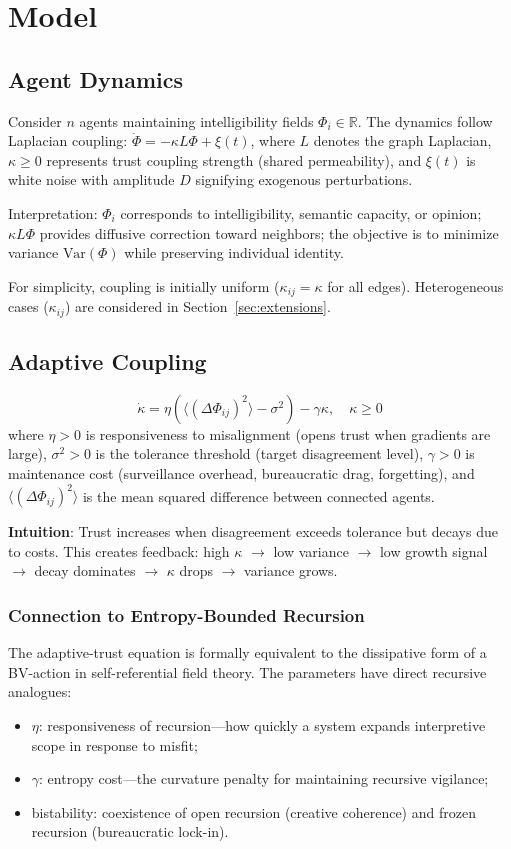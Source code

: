 \documentclass[12pt,a4paper]{article}
\begin{document}
\section{Model}

\subsection{Agent Dynamics}
Consider $n$ agents maintaining intelligibility fields $\Phi_i \in \mathbb{R}$. The dynamics follow Laplacian coupling: $\dot{\Phi} = -\kappa L \Phi + \xi(t)$, where $L$ denotes the graph Laplacian, $\kappa \geq 0$ represents trust coupling strength (shared permeability), and $\xi(t)$ is white noise with amplitude $D$ signifying exogenous perturbations.

Interpretation: $\Phi_i$ corresponds to intelligibility, semantic capacity, or opinion; $\kappa L \Phi$ provides diffusive correction toward neighbors; the objective is to minimize variance $\text{Var}(\Phi)$ while preserving individual identity.

For simplicity, coupling is initially uniform ($\kappa_{ij} = \kappa$ for all edges). Heterogeneous cases ($\kappa_{ij}$) are considered in Section~\ref{sec:extensions}.

\subsection{Adaptive Coupling}
\begin{equation}
\dot{\kappa} = \eta \left( \langle (\Delta \Phi_{ij})^2 \rangle - \sigma^2 \right) - \gamma \kappa, \quad \kappa \geq 0
\end{equation}
where $\eta > 0$ is responsiveness to misalignment (opens trust when gradients are large), $\sigma^2 > 0$ is the tolerance threshold (target disagreement level), $\gamma > 0$ is maintenance cost (surveillance overhead, bureaucratic drag, forgetting), and $\langle (\Delta \Phi_{ij})^2 \rangle$ is the mean squared difference between connected agents.

\textbf{Intuition}: Trust increases when disagreement exceeds tolerance but decays due to costs. This creates feedback: high $\kappa$ $\to$ low variance $\to$ low growth signal $\to$ decay dominates $\to$ $\kappa$ drops $\to$ variance grows.

\subsubsection{Connection to Entropy-Bounded Recursion}
The adaptive-trust equation is formally equivalent to the dissipative form of a BV-action in self-referential field theory. The parameters have direct recursive analogues:
\begin{itemize}
\item $\eta$: responsiveness of recursion---how quickly a system expands interpretive scope in response to misfit;
\item $\gamma$: entropy cost---the curvature penalty for maintaining recursive vigilance;
\item bistability: coexistence of open recursion (creative coherence) and frozen recursion (bureaucratic lock-in).
\end{itemize}
\end{document}
